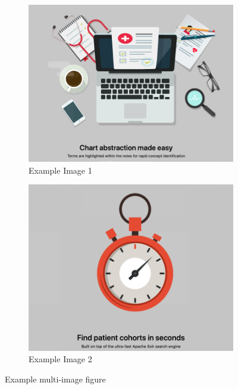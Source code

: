 \begin{figure}
    \centering
    \begin{subfigure}{0.4\textwidth}
        \includegraphics[width=\textwidth]{Resources/Images/Banner1.png}
        \caption[width=\textwidth]{Example Image 1}
        \label{fig:sub_bigrams3_apdx}
    \end{subfigure}
    \hfill
    \begin{subfigure}{0.4\textwidth}
        \includegraphics[width=\textwidth]{Resources/Images/Banner2.png}
        \caption[width=\textwidth]{Example Image 2}
        \label{fig:sub_trigrams3_apdx}
    \end{subfigure}
    \hfill
    \caption{Example multi-image figure}
    \label{fig:subfig_example}
\end{figure}


